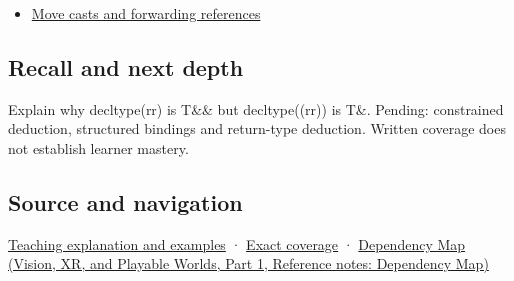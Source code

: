 \hypertarget{appendix-5d4252a42886-used-by}{}

\begin{itemize}
\tightlist
\item
  \hyperref[appendix-0104b704fb11]{Move casts and forwarding references}
\end{itemize}

\subsection{Recall and next depth}\label{appendix-5d4252a42886-recall-and-next-depth}

\hypertarget{appendix-5d4252a42886-recall-and-next-depth}{}

Explain why decltype(rr) is T\&\& but decltype((rr)) is T\&. Pending: constrained deduction, structured bindings and return-type deduction. Written coverage does not establish learner mastery.

\subsection{Source and navigation}\label{appendix-5d4252a42886-source-and-navigation}

\hypertarget{appendix-5d4252a42886-source-and-navigation}{}

\hyperref[01-foundations-i-ch003-an-expression-has-a-type-and-a-category]{Teaching explanation and examples} · \hyperref[appendix-fd090d982a15-m008---parts-113-126]{Exact coverage} · \href{../07-Vision-XR-and-Playable-Worlds-P01/main.pdf\#nameddest=appendix-4ad47bdd269a}{Dependency Map (Vision, XR, and Playable Worlds, Part 1, Reference notes: Dependency Map)}
